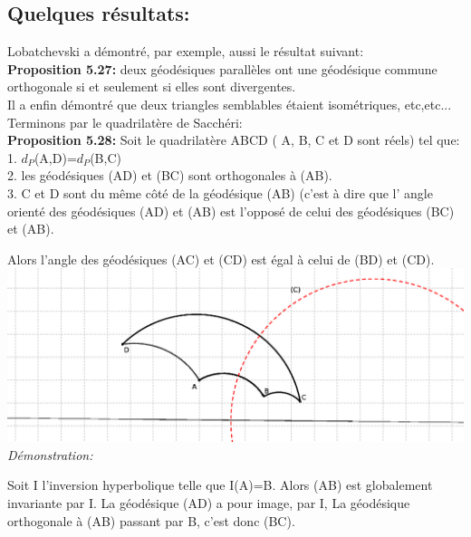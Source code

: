 \documentclass[a4paper, 12pt, twoside]{book}
\begin{document}
  \newpage  \subsection{Quelques résultats:}
  
   
   
   Lobatchevski a démontré, par exemple, aussi le résultat suivant: \\
   
  
   
   \textbf{Proposition 5.27:} deux géodésiques parallèles ont une géodésique commune orthogonale si et seulement si elles sont divergentes.\\
   
   Il a enfin démontré que deux triangles semblables étaient isométriques, etc,etc...\\
   
   Terminons par le quadrilatère de Sacchéri:\\
   
   \textbf{Proposition 5.28:} Soit le quadrilatère ABCD ( A, B, C et D sont réels) tel que:\\
   
   1. $d_{P}$(A,D)=$d_{P}$(B,C)\\
   
   2. les géodésiques (AD) et (BC) sont orthogonales à (AB).\\
   
   3. C et D sont du même côté de la géodésique (AB) (c'est à dire que l' angle orienté des géodésiques (AD) et (AB) est l'opposé de celui des géodésiques (BC) et (AB).\
   
   Alors l'angle des géodésiques (AC) et (CD) est égal à celui de (BD) et (CD).\\
   
   \includegraphics[scale=0.9]{figures/lob5.eps}\\
   
   \textit{Démonstration:}\
   
   Soit I l'inversion hyperbolique telle que I(A)=B. Alors (AB) est globalement invariante par I. 
   La géodésique (AD) a pour image, par I, La géodésique orthogonale à (AB) passant par B, c'est donc (BC).\\
   
\end{document}
